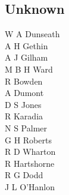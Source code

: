 \begin{multicols}{2}
  \section*{Unknown}
  W A Dunseath \\
  A H Gethin \\
  A J Gilham \\
  M B H Ward \\
  R Bowden \\
  A Dumont \\
  D S Jones \\
  R Karadia \\
  N S Palmer \\
  G H Roberts \\
  R D Wharton \\
  R Hartshorne \\
  R G Dodd \\
  J L O'Hanlon \\
\end{multicols}
